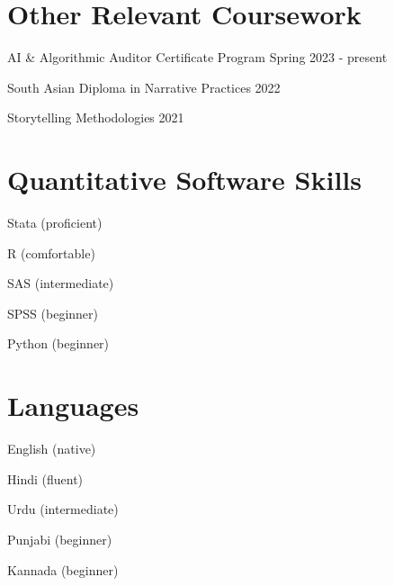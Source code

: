 \documentclass[11pt,letterpaper]{report}
\newcommand{\listitemspace}{0.25em}
\renewenvironment{itemize}{\begin{list}{}{\setlength{\leftmargin}{0em}\setlength{\parskip}{0em}\setlength{\itemsep}{\listitemspace}\setlength{\parsep}{\listitemspace}}}{\end{list}}
\begin{document}
    \section*{Other Relevant Coursework}
    \begin{itemize}
        \item AI \& Algorithmic Auditor Certificate Program Spring 2023 - present
        \item South Asian Diploma in Narrative Practices 2022
        \item Storytelling Methodologies 2021
    \end{itemize}

    \section*{Quantitative Software Skills}
    \begin{itemize}
        \item Stata (proficient)
        \item R (comfortable)
        \item SAS (intermediate)
        \item SPSS (beginner)
        \item Python (beginner)
    \end{itemize}

    \section*{Languages}
    \begin{itemize}
        \item English (native)
        \item Hindi (fluent)
        \item Urdu (intermediate)
        \item Punjabi (beginner)
        \item Kannada (beginner)
    \end{itemize}
\end{document}
